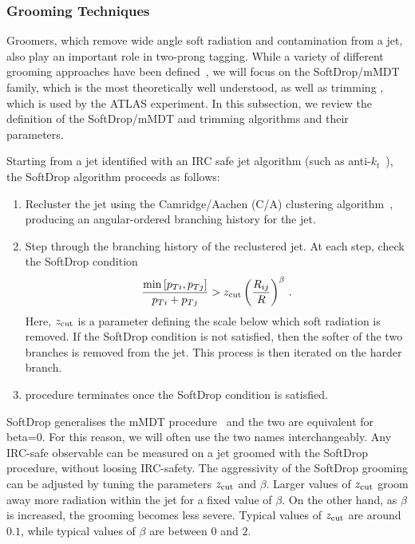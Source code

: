 \documentclass[11pt]{cernrep}
\begin{document}
\subsubsection{Grooming Techniques}\label{jetsub_2prong_sec:groom_tech}

Groomers, which remove wide angle soft radiation and contamination from a jet, also play an important role in two-prong tagging.
%
While a variety of different grooming approaches have been defined~\cite{Butterworth:2008iy,Ellis:2009su,Ellis:2009me,Krohn:2009th,Dasgupta:2013via,Dasgupta:2013ihk}, we will focus on the SoftDrop/mMDT family, which is the most theoretically well understood, as well as trimming \cite{Krohn:2009th}, which is used by the ATLAS experiment.
%
In this subsection, we review the definition of the SoftDrop/mMDT and trimming algorithms and their parameters.

Starting from a jet identified with an IRC safe jet algorithm (such as
anti-$k_t$~\cite{Cacciari:2008gp}), the SoftDrop algorithm proceeds as follows:
%
\begin{enumerate}
%
\item Recluster the jet using the Camridge/Aachen (C/A) clustering
  algorithm~\cite{Dokshitzer:1997in,Wobisch:1998wt,Wobisch:2000dk},
  producing an angular-ordered branching history for the jet.
%
\item Step through the branching history of the reclustered jet.  At each step, check the SoftDrop condition
\begin{align}\label{jetsub_2prong_eq:sd_cut}
\frac{\min\left[ p_{Ti}, p_{Tj}  \right]}{p_{Ti}+p_{Tj}}> {z_{\rm cut}} \left(   \frac{R_{ij}}{R}\right)^\beta \,.
\end{align}
Here, ${z_{\rm cut}}$ is a parameter defining the scale below which soft radiation is removed.  If the SoftDrop condition is not satisfied, then the softer of the two branches is removed from the jet.  This process is then iterated on the harder branch.
%
\item procedure terminates once the SoftDrop condition is satisfied.
%
\end{enumerate}
SoftDrop generalises the mMDT procedure~\cite{Dasgupta:2013ihk} and
the two are equivalent for beta=0. For this reason, we will often use
the two names interchangeably.
%
Any IRC-safe observable can be measured on a jet groomed with the
SoftDrop procedure, without loosing IRC-safety.
%
The aggressivity of the SoftDrop grooming can be adjusted by
tuning the parameters ${z_{\rm cut}}$ and $\beta$.
%
Larger values of ${z_{\rm cut}}$ groom away more radiation within the jet for a fixed value of $\beta$.
%
On the other hand, as $\beta$ is increased, the grooming becomes less
severe.
%
Typical values of ${z_{\rm cut}}$ are around $0.1$, while typical
values of $\beta$ are between $0$ and $2$.
\end{document}
